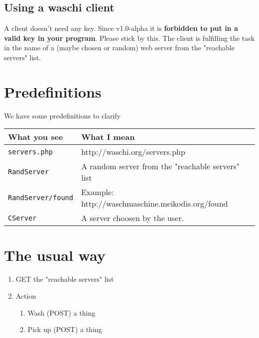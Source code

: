 \documentclass[letterpaper,twoside]{scrartcl}
\begin{document}
  \subsection{Using a waschi client}
   A client doesn't need any key. Since v1.0-alpha it is \textbf{forbidden to put in a valid key in your program}. Please stick by this. 
   The client is fulfilling the task in the name of a (maybe chosen or random) web server from the "reachable servers" list.
   \newline



 \section{Predefinitions}
  We have some predefinitions to clarify
  \newline

  \begin{tabular}[ht]{|l|l|}
   \hline
   \textbf{What you see} & \textbf{What I mean}\\
   \hline\hline
   \texttt{servers.php} & http://waschi.org/servers.php\\
   \hline
   \texttt{RandServer} & A random server from the "reachable servers" list\\
   \hline
   \texttt{RandServer/found} & Example: http://waschmaschine.meikodis.org/found\\
   \hline
   \texttt{CServer} & A server choosen by the user.\\
   \hline
  \end{tabular}
  \newline



 \section{The usual way}
  \begin{enumerate}
   \item GET the "reachable servers" list
   \item Action
   \begin{enumerate}
    \item Wash (POST) a thing
    \item Pick up (POST) a thing
   \end{enumerate}
  \end{enumerate}

\end{document}
